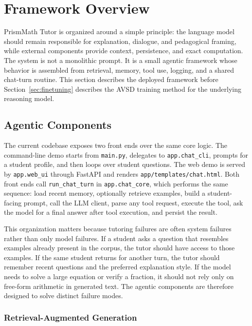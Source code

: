 \section{Framework Overview}

PrismMath Tutor is organized around a simple principle: the language model should remain responsible for explanation, dialogue, and pedagogical framing, while external components provide context, persistence, and exact computation. The system is not a monolithic prompt. It is a small agentic framework whose behavior is assembled from retrieval, memory, tool use, logging, and a shared chat-turn routine. This section describes the deployed framework before Section~\ref{sec:finetuning} describes the AVSD training method for the underlying reasoning model.

\subsection{Agentic Components}

The current codebase exposes two front ends over the same core logic. The command-line demo starts from \texttt{main.py}, delegates to \texttt{app.chat\_cli}, prompts for a student profile, and then loops over student questions. The web demo is served by \texttt{app.web\_ui} through FastAPI and renders \texttt{app/templates/chat.html}. Both front ends call \texttt{run\_chat\_turn} in \texttt{app.chat\_core}, which performs the same sequence: load recent memory, optionally retrieve examples, build a student-facing prompt, call the LLM client, parse any tool request, execute the tool, ask the model for a final answer after tool execution, and persist the result.

This organization matters because tutoring failures are often system failures rather than only model failures. If a student asks a question that resembles examples already present in the corpus, the tutor should have access to those examples. If the same student returns for another turn, the tutor should remember recent questions and the preferred explanation style. If the model needs to solve a large equation or verify a fraction, it should not rely only on free-form arithmetic in generated text. The agentic components are therefore designed to solve distinct failure modes.

\subsubsection{Retrieval-Augmented Generation}

